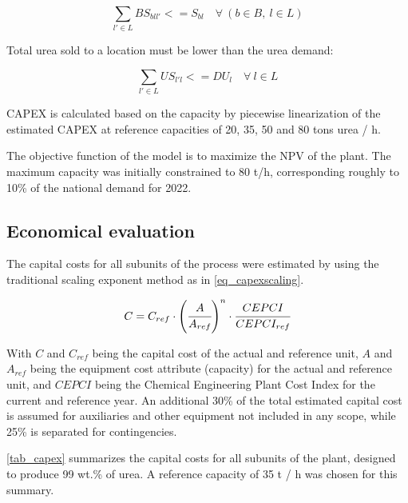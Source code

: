 \documentclass[a4paper, titlepage]{article}
\begin{document}
\begin{equation}
    \sum_{l' \in L} BS_{bll'} <= S_{bl} \quad \forall \ (b \in B, \ l \in L)
\end{equation}

Total urea sold to a location must be lower than the urea demand:

\begin{equation}
    \sum_{l' \in L} US_{l'l} <= DU_l \quad \forall \ l \in L
\end{equation}

CAPEX is calculated based on the capacity by piecewise linearization of the estimated CAPEX at reference capacities of
20, 35, 50 and 80 tons urea / h.

The objective function of the model is to maximize the NPV of the plant. The maximum capacity was initially constrained
to 80 t/h, corresponding roughly to 10\% of the national demand for 2022.


\subsection{Economical evaluation}
The capital costs for all subunits of the process were estimated by using the traditional scaling exponent method
\cite{turtonAnalysisSynthesisDesign2018} as in \autoref{eq_capexscaling}.

\begin{equation}
    C = C_{ref} \cdot \left( \cfrac{A}{A_{ref}} \right)^n \cdot \cfrac{CEPCI}{CEPCI_{ref}}
    \label{eq_capexscaling}
\end{equation}

With $C$ and $C_{ref}$ being the capital cost of the actual and reference unit, $A$ and $A_{ref}$ being the equipment
cost attribute (capacity) for the actual and reference unit, and $CEPCI$ being the Chemical Engineering Plant
Cost Index for the current and reference year. An additional
30\% of the total estimated capital cost is assumed for auxiliaries and other equipment not included in any scope,
while 25\% is separated for contingencies.

\autoref{tab_capex} summarizes the capital costs for all subunits of the plant, designed to produce 99 wt.\% of urea.
A reference capacity of 35 t / h was chosen for this summary.
\end{document}
